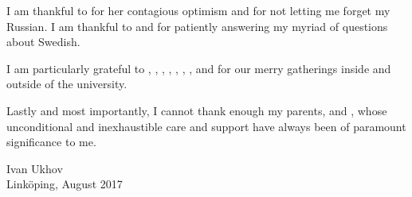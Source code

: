 I am thankful to  for her contagious optimism and
for not letting me forget my Russian. I am thankful to 
and  for patiently answering my myriad of questions about
Swedish.

I am particularly grateful to , ,
, , ,
, , and
 for our merry gatherings inside and outside of the
university.

Lastly and most importantly, I cannot thank enough my parents,
 and , whose unconditional and
inexhaustible care and support have always been of paramount significance to me.

\vspace{4em}
\hfill
\begin{minipage}{0.35\textwidth}
Ivan Ukhov\\
Linköping, August 2017
\end{minipage}

